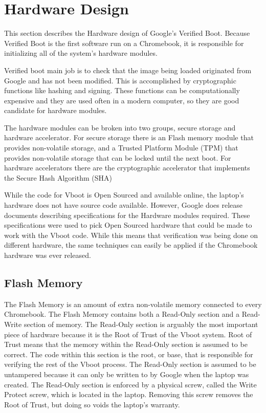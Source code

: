 \documentclass[../report.tex]{subfiles}
\begin{document}
\onehalfspacing

\newpage
\section{Hardware Design}


This section describes the Hardware design of Google's Verified Boot. 
Because Verified Boot is the first software run on a Chromebook, it is
responsible for initializing all of the system's hardware modules.

Verified boot main job is to check that the image being loaded originated from
Google and has not been modified. 
This is accomplished by cryptographic functions like hashing and signing.
These functions can be computationally expensive and they are used often in a
modern computer, so they are good candidate for hardware modules.  

The hardware modules can be broken into two groups, secure storage and hardware accelerator.
For secure storage there is an Flash memory module that provides non-volatile storage, and a Trusted Platform Module (TPM) that provides non-volatile storage that can be locked until the next boot.
For hardware accelerators there are the cryptographic accelerator that
implements the Secure Hash Algorithm (SHA) 

While the code for Vboot is Open Sourced and available online, the laptop's
hardware does not have source code available.
However, Google does release documents describing specifications for the
Hardware modules required. 
These specifications were used to pick Open Sourced hardware that could be made
to work with the Vboot code. 
While this means that verification was being done on different hardware, the
same techniques can easily be applied if the Chromebook hardware was ever
released.

\subsection{Flash Memory}\label{flash_mem}

The Flash Memory is an amount of extra non-volatile memory connected to every Chromebook. 
The Flash Memory contains both a Read-Only section and a Read-Write section of memory.
The Read-Only section is arguably the most important piece of hardware because it is the Root of Trust of the Vboot system.
Root of Trust means that the memory within the Read-Only section is assumed to be correct.
The code within this section is the root, or base, that is responsible for verifying the rest of the Vboot process.
The Read-Only section is assumed to be untampered because it can only be written
to by Google when the laptop was created.
The Read-Only section is enforced by a physical screw, called the Write Protect screw, which is located in the laptop.
Removing this screw removes the Root of Trust, but doing so voids the laptop's warranty.
\end{document}
